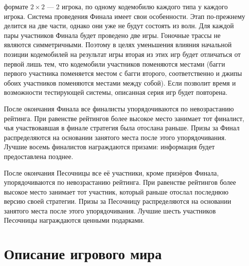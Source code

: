 \begin{itemize}
        формате $2\times2$ --- $2$ игрока, по одному кодемобилю каждого типа у каждого игрока. Система проведения Финала имеет свои
        особенности. Этап по-прежнему делится на две части, однако они уже не будут состоять из волн. Для каждой пары участников Финала
        будет проведено две игры. Гоночные трассы не являются симметричными. Поэтому в целях уменьшения влияния начальной позиции
        кодемобилей на результат игры вторая из этих игр будет отличаться от первой лишь тем, что кодемобили участников поменяются местами
        (багги первого участника поменяется местом с багги второго, соответственно и джипы обоих участников поменяются местами между собой).
        Если позволит время и возможности тестирующей системы, описанная серия игр будет повторена.
\end{itemize}

После окончания Финала все финалисты упорядочиваются по невозрастанию рейтинга. При равенстве рейтингов более высокое место занимает тот
финалист, чья участвовавшая в финале стратегия была отослана раньше. Призы за Финал распределяются на основании занятого места после этого
упорядочивания. Лучшие восемь финалистов награждаются призами: информация будет предоставлена позднее.

После окончания Песочницы все её участники, кроме призёров Финала, упорядочиваются по невозрастанию рейтинга. При равенстве рейтингов более
высокое место занимает тот участник, который раньше отослал последнюю версию своей стратегии. Призы за Песочницу распределяются на основании
занятого места после этого упорядочивания. Лучшие шесть участников Песочницы награждаются ценными подарками.

\section{Описание игрового мира}

